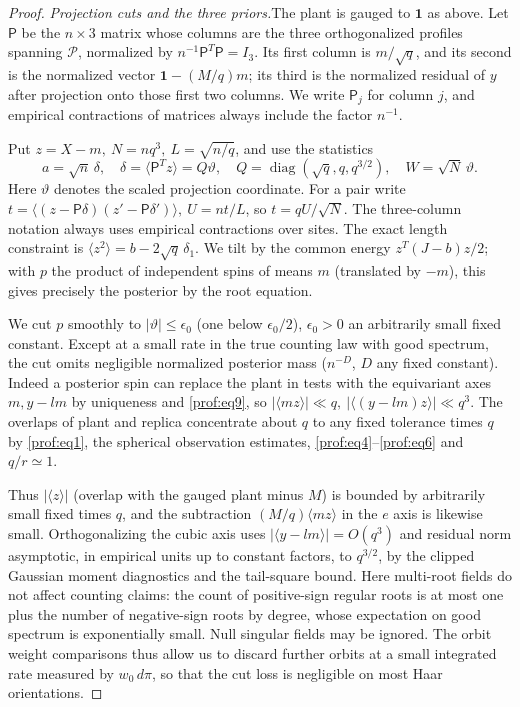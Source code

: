 \begin{proof}
\par\smallskip\noindent\textit{Projection cuts and the three priors.}\enspace The plant is gauged to $\mathbf1$ as above. Let $\mathsf P$ be the
$n\times3$ matrix whose columns are the three orthogonalized profiles spanning
$\mathcal P$, normalized by $n^{-1}\mathsf P^T\mathsf P=I_3$.
Its first column is $m/\sqrt q$, and its second is the normalized vector
$\mathbf1-(M/q)m$; its third is the normalized residual of $y$ after
projection onto those first two columns. We write $\mathsf P_j$ for column
$j$, and empirical contractions of matrices always include the factor $n^{-1}$.

Put \(z=X-m,\ N=nq^3,\ L=\sqrt{n/q}\), and use the statistics
\[
 a=\sqrt n\,\delta,\quad \delta=\langle \mathsf P^T z\rangle=Q \vartheta,\quad Q=\operatorname{diag}(\sqrt q,q,q^{3/2}),\quad W=\sqrt N\, \vartheta.
\]
Here \(\vartheta\) denotes the scaled projection coordinate. For a pair write \(t=\langle(z-\mathsf P\delta)(z'-\mathsf P\delta')\rangle,\ U=n t/L\), so \(t=qU/\sqrt N\). The three-column notation always uses empirical contractions over sites. The exact length constraint is \(\langle z^2\rangle=b-2\sqrt q\,\delta_1\). We tilt by the common energy \(z^T(J-b)z/2\); with \(p\) the product of independent spins of means \(m\) (translated by \(-m\)), this gives precisely the posterior by the root equation.

We cut \(p\) smoothly to \(|\vartheta|\le\epsilon_0\) (one below
\(\epsilon_0/2\)), \(\epsilon_0>0\) an arbitrarily small fixed constant.
Except at a small rate in the true counting law with good spectrum, the
cut omits negligible normalized posterior mass (\(n^{-D}\), \(D\) any
fixed constant). Indeed a posterior spin can replace the plant in tests
with the equivariant axes \(m,y-lm\) by uniqueness and
\eqref{prof:eq9}, so
\(|\langle m z\rangle|\ll q,\ |\langle(y-lm)z\rangle|\ll q^3\).
The overlaps of plant and replica concentrate about \(q\) to any fixed
tolerance times \(q\) by \eqref{prof:eq1}, the spherical observation
estimates, \eqref{prof:eq4}–\eqref{prof:eq6} and \(q/r\simeq1\).

Thus \(|\langle z\rangle|\) (overlap with the gauged plant minus \(M\))
is bounded by arbitrarily small fixed times \(q\), and the subtraction
\((M/q)\langle mz\rangle\) in the \(e\) axis is likewise small.
Orthogonalizing the cubic axis uses \(|\langle y-lm\rangle|=O(q^3)\)
and residual norm asymptotic, in empirical units up to constant factors,
to \(q^{3/2}\), by the clipped Gaussian moment diagnostics and the
tail-square bound. Here multi-root fields do not affect counting claims:
the count of positive-sign regular roots is at most one plus the number
of negative-sign roots by degree, whose expectation on good spectrum is
exponentially small. Null singular fields may be ignored. The orbit
weight comparisons thus allow us to discard further orbits at a small
integrated rate measured by \(w_0\,d\pi\), so that the cut loss is
negligible on most Haar orientations.


\end{proof}
